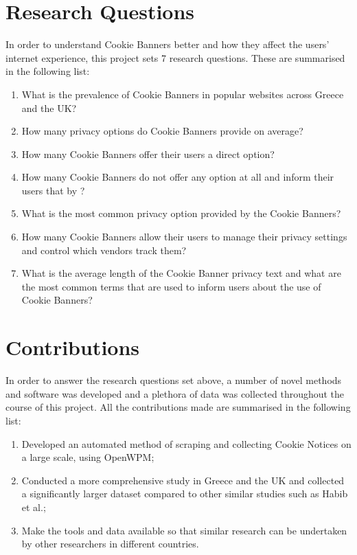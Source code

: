 \documentclass[../main.tex]{subfiles}
\begin{document}
\section{Research Questions}

In order to understand Cookie Banners better and how they affect the users’ internet experience, this project sets 7 research questions. These are summarised in the following list:

\begin{enumerate}[label=\textbf{RQ\arabic*}:, ref=RQ\arabic*, leftmargin=1.65cm]
    \item \label{rq:prevalence} What is the prevalence of Cookie Banners in popular websites across Greece and the UK? 
    \item \label{rq:options_avg} How many privacy options do Cookie Banners provide on average?
    \item \label{rq:direct_opt_out} How many Cookie Banners offer their users a direct  option?
    \item \label{rq:no_options} How many Cookie Banners do not offer any option at all and inform their users that by ?
    \item \label{rq:common_ctas} What is the most common privacy option provided by the Cookie Banners? 
    \item \label{rq:manage_options_count} How many Cookie Banners allow their users to manage their privacy settings and control which vendors track them?
    \item \label{rq:common_privacy_txt} What is the average length of the Cookie Banner privacy text and what are the most common terms that are used to inform users about the use of Cookie Banners?
\end{enumerate}
    
\section{Contributions}

In order to answer the research questions set above, a number of novel methods and software was developed and a plethora of data was collected throughout the course of this project. All the contributions made are summarised in the following list:

\begin{enumerate}
    \item \label{contr_1} Developed an automated method of scraping and collecting Cookie Notices on a large scale, using OpenWPM;
    \item \label{contr_2} Conducted a more comprehensive study in Greece and the UK and collected a significantly larger dataset compared to other similar studies such as Habib et al.;
    \item \label{contr_3} Make the tools and data available so that similar research can be undertaken by other researchers in different countries.
\end{enumerate}
\end{document}
